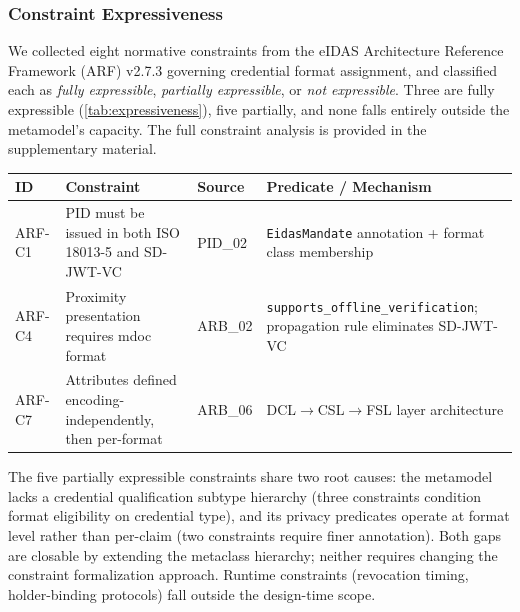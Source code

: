 
\subsubsection{Constraint Expressiveness}\label{constraint-expressiveness}

\label{sec:expressiveness}

We collected eight normative constraints from the eIDAS Architecture Reference Framework (ARF) v2.7.3 \citep{noauthor_eu-digital-identity-walleteudi-doc-architecture-and-reference-framework_2026} governing credential format assignment, and classified each as \emph{fully expressible}, \emph{partially expressible}, or \emph{not expressible}. Three are fully expressible (\autoref{tab:expressiveness}), five partially, and none falls entirely outside the metamodel's capacity. The full constraint analysis is provided in the supplementary material.

\begin{center}
\begin{tabular}{llll}
\toprule
ID & Constraint & Source & Predicate / Mechanism \\
\midrule
ARF-C1 & PID must be issued in both ISO 18013-5 and SD-JWT-VC & PID\_02 & \texttt{EidasMandate} annotation + format class membership \\
ARF-C4 & Proximity presentation requires mdoc format & ARB\_02 & \texttt{supports\_offline\_verification}; propagation rule eliminates
SD-JWT-VC \\
ARF-C7 & Attributes defined encoding-independently, then per-format & ARB\_06 & DCL\(\to\)CSL\(\to\)FSL layer architecture \\
\bottomrule
\end{tabular}
\end{center}


The five partially expressible constraints share two root causes: the metamodel lacks a credential qualification subtype hierarchy (three constraints condition format eligibility on credential type), and its privacy predicates operate at format level rather than per-claim (two constraints require finer annotation). Both gaps are closable by extending the metaclass hierarchy; neither requires changing the constraint formalization approach. Runtime constraints (revocation timing, holder-binding protocols) fall outside the design-time scope.

